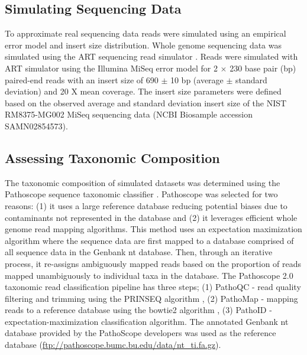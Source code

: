 \documentclass[fleqn,10pt,lineno]{wlpeerj}\usepackage[]{graphicx}\usepackage[]{color}
\begin{document}
\subsection*{Simulating Sequencing Data}
To approximate real sequencing data reads were simulated using an empirical error model and insert size distribution.
Whole genome sequencing data was simulated using the ART sequencing read simulator \citep{Huang2012}.
Reads were simulated with ART simulator using the Illumina MiSeq error model for 2 $\times$ 230 base pair (bp) paired-end reads with an insert size of 690 $\pm$ 10 bp (average $\pm$ standard deviation) and 20 X mean coverage.
The insert size parameters were defined based on the observed average and standard deviation insert size of the NIST RM8375-MG002 MiSeq sequencing data \citep{olson2016pepr} (NCBI Biosample accession SAMN02854573).

\subsection*{Assessing Taxonomic Composition}
The taxonomic composition of simulated datasets was determined using the Pathoscope sequence taxonomic classifier \citep{Francis2013}.
Pathoscope was selected for two reasons: (1) it uses a large reference database reducing potential biases due to contaminants not represented in the database and (2) it leverages efficient whole genome read mapping algorithms.
This method uses an expectation maximization algorithm where the sequence data are first mapped to a database comprised of all sequence data in the Genbank nt database.
Then, through an iterative process, it re-assigns ambiguously mapped reads based on the proportion of reads mapped unambiguously to individual taxa in the database.
The Pathoscope 2.0 taxonomic read classification pipeline has three steps; (1) PathoQC - read quality filtering and trimming using the PRINSEQ algorithm \citep{schmieder2011quality}, (2) PathoMap - mapping reads to a reference database using the bowtie2 algorithm \citep{Langmead2012}, (3) PathoID - expectation-maximization classification algorithm.
The annotated Genbank nt database provided by the PathoScope developers was used as the reference database (\url{ftp://pathoscope.bumc.bu.edu/data/nt\_ti.fa.gz}).
\end{document}
